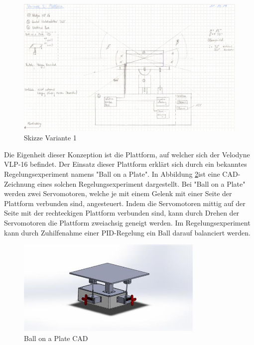 \begin{figure}[H]
	\centering
	\includegraphics[width=1\textwidth]{resources/skizzev1.PNG}
	\caption{Skizze Variante 1}
\label{fig:plattform}
\end{figure} 
	
 Die Eigenheit dieser Konzeption ist die Plattform, auf welcher sich der Velodyne VLP-16 befindet. Der Einsatz dieser Plattform erklärt sich durch ein bekanntes Regelungsexperiment namens "Ball on a Plate". In Abbildung \ref{fig:BalllonaPlateCAD}ist eine CAD-Zeichnung eines solchen Regelungsexperiment dargestellt. Bei "Ball on a Plate" werden zwei Servomotoren, welche je mit einem Gelenk mit einer Seite der Plattform verbunden sind, angesteuert. Indem die Servomotoren mittig auf der Seite mit der rechteckigen Plattform verbunden sind, kann durch Drehen der Servomotoren die Plattform zweiachsig geneigt werden. Im Regelungsexperiment kann durch Zuhilfenahme einer PID-Regelung ein Ball darauf balanciert werden. \cite{ballonaplate}
 
\begin{figure}[H]
	\centering
 	\includegraphics[width=0.8\textwidth]{resources/ballonaplate_cad}
	\caption{Ball on a Plate CAD {\cite{ballonaplate}}}
	\label{fig:BalllonaPlateCAD}
\end{figure} 


